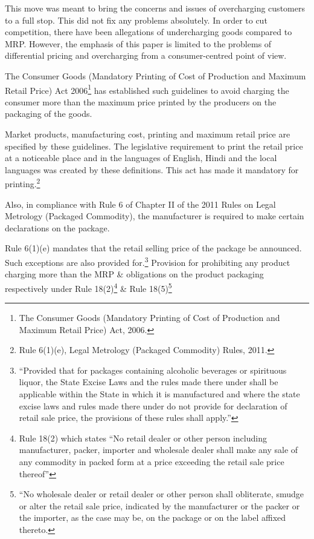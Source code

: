 \begin{multicols}{2}
\noi
This move was meant to bring the concerns and issues of overcharging customers to a full stop.
This did not fix any problems absolutely. In order to cut competition, there have been allegations of undercharging goods compared to MRP. However, the emphasis of this paper is
limited to the problems of differential pricing and overcharging from a consumer-centred point
of view.

\noi
The Consumer Goods (Mandatory Printing of Cost of Production and Maximum Retail Price)
Act 2006\footnote{The Consumer Goods (Mandatory Printing of Cost of Production and Maximum Retail Price) Act, 2006.} has established such guidelines to avoid charging the consumer more than the
maximum price printed by the producers on the packaging of the goods.

\noi
Market products, manufacturing cost, printing and maximum retail price are specified by these
guidelines. The legislative requirement to print the retail price at a noticeable place and in the
languages of English, Hindi and the local languages was created by these definitions. This act
has made it mandatory for printing.\footnote{Rule 6(1)(e), Legal Metrology (Packaged Commodity) Rules, 2011.}

\noi
Also, in compliance with Rule 6 of Chapter II of the 2011 Rules on Legal Metrology (Packaged
Commodity), the manufacturer is required to make certain declarations on the package.

\noi
Rule 6(1)(e) mandates that the retail selling price of the package be announced. Such
exceptions are also provided for.\footnote{“Provided that for packages containing alcoholic beverages or spirituous liquor, the State Excise Laws and the rules made there under shall be applicable within the State in which it is manufactured and where the state excise laws and rules made there under do not provide for declaration of retail sale price, the provisions of these rules shall apply.”} Provision for prohibiting any product charging more than the MRP \& obligations on the product packaging respectively under Rule 18(2)\footnote{Rule 18(2) which states “No retail dealer or other person including manufacturer, packer, importer and wholesale dealer shall make any sale of any commodity in packed form at a price exceeding the retail sale price thereof”} \& Rule 18(5)\footnote{“No wholesale dealer or retail dealer or other person shall obliterate, smudge or alter the retail sale price, indicated by the manufacturer or the packer or the importer, as the case may be, on the package or on the label affixed thereto.}


\end{multicols}
